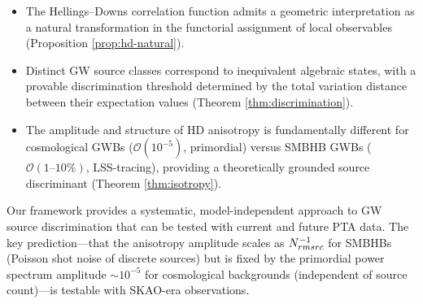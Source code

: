 \documentclass[11pt,a4paper]{article}
\begin{document}
\begin{itemize}
\item The Hellings--Downs correlation function admits a geometric interpretation as a natural transformation in the functorial assignment of local observables (Proposition \ref{prop:hd-natural}).
\item Distinct GW source classes correspond to inequivalent algebraic states, with a provable discrimination threshold determined by the total variation distance between their expectation values (Theorem \ref{thm:discrimination}).
\item The amplitude and structure of HD anisotropy is fundamentally different for cosmological GWBs ($\mathcal{O}(10^{-5})$, primordial) versus SMBHB GWBs ($\mathcal{O}(1\text{--}10\%)$, LSS-tracing), providing a theoretically grounded source discriminant (Theorem \ref{thm:isotropy}).
\end{itemize}

Our framework provides a systematic, model-independent approach to GW source discrimination that can be tested with current and future PTA data. The key prediction---that the anisotropy amplitude scales as $N_{\\rm src}^{-1}$ for SMBHBs (Poisson shot noise of discrete sources) but is fixed by the primordial power spectrum amplitude $\sim 10^{-5}$ for cosmological backgrounds (independent of source count)---is testable with SKAO-era observations.
\end{document}
